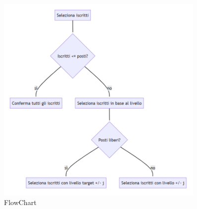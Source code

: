 \begin{figure}[ht!]
    \centering
    \includegraphics[width = 0.9\textwidth]{Iterazione 2/images/flowchart.png}
    \caption{FlowChart}
	\label{fig:FlowChart}
\end{figure}

